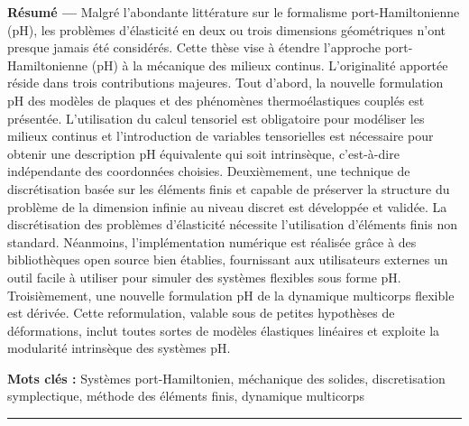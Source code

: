 \begin{vcenterpage}
\thispagestyle{empty}
{\large\textbf{Résumé ---}}
 Malgré l'abondante littérature sur le formalisme port-Hamiltonienne (pH), les problèmes d'élasticité en deux ou trois dimensions géométriques n'ont presque jamais été considérés. Cette thèse vise à étendre l'approche port-Hamiltonienne (pH) à la mécanique des milieux continus. L'originalité apportée réside dans trois contributions majeures. Tout d'abord, la nouvelle formulation pH des modèles de plaques et des phénomènes thermoélastiques couplés est présentée. L'utilisation du calcul tensoriel est obligatoire pour modéliser les milieux  continus et l'introduction de variables tensorielles est nécessaire pour obtenir une description pH équivalente qui soit intrinsèque, c'est-à-dire indépendante des coordonnées choisies. Deuxièmement, une technique de discrétisation basée sur les éléments finis et capable de préserver la structure du problème de la dimension infinie au niveau discret est développée et validée. La discrétisation des problèmes d'élasticité nécessite l'utilisation d'éléments finis non standard. Néanmoins, l'implémentation numérique est réalisée grâce à des bibliothèques open source bien établies, fournissant aux utilisateurs externes un outil facile à utiliser pour simuler des systèmes flexibles sous forme pH. Troisièmement, une nouvelle formulation pH de la dynamique multicorps flexible est dérivée. Cette reformulation, valable sous de petites hypothèses de déformations, inclut toutes sortes de modèles élastiques linéaires et exploite la modularité intrinsèque des systèmes pH.

{\large\textbf{Mots clés :}}
    Systèmes port-Hamiltonien, méchanique des solides, discretisation symplectique, méthode des éléments finis, dynamique multicorps
\\
\noindent\rule[2pt]{\textwidth}{0.5pt}



\end{vcenterpage}

